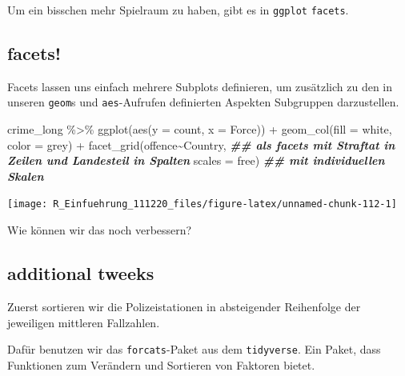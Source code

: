 \documentclass[
]{book}
\newenvironment{Shaded}{\begin{snugshade}}{\end{snugshade}}
\newcommand{\AttributeTok}[1]{\textcolor[rgb]{0.77,0.63,0.00}{#1}}
\newcommand{\DocumentationTok}[1]{\textcolor[rgb]{0.56,0.35,0.01}{\textbf{\textit{#1}}}}
\newcommand{\FunctionTok}[1]{\textcolor[rgb]{0.00,0.00,0.00}{#1}}
\newcommand{\NormalTok}[1]{#1}
\newcommand{\SpecialCharTok}[1]{\textcolor[rgb]{0.00,0.00,0.00}{#1}}
\newcommand{\StringTok}[1]{\textcolor[rgb]{0.31,0.60,0.02}{#1}}
\begin{document}
Um ein bisschen mehr Spielraum zu haben, gibt es in \texttt{ggplot} \texttt{facets}.

\hypertarget{facets}{%
\subsection{facets!}\label{facets}}

Facets lassen uns einfach mehrere Subplots definieren, um zusätzlich zu den in unseren \texttt{geom}s und \texttt{aes}-Aufrufen definierten Aspekten Subgruppen darzustellen.

\begin{Shaded}
\begin{Highlighting}[]
\NormalTok{crime\_long }\SpecialCharTok{\%\textgreater{}\%}  
  \FunctionTok{ggplot}\NormalTok{(}\FunctionTok{aes}\NormalTok{(}\AttributeTok{y =}\NormalTok{ count,}
             \AttributeTok{x =}\NormalTok{ Force)) }\SpecialCharTok{+}
  \FunctionTok{geom\_col}\NormalTok{(}\AttributeTok{fill =} \StringTok{\textquotesingle{}white\textquotesingle{}}\NormalTok{,}
           \AttributeTok{color =} \StringTok{\textquotesingle{}grey\textquotesingle{}}\NormalTok{) }\SpecialCharTok{+}
  \FunctionTok{facet\_grid}\NormalTok{(offence}\SpecialCharTok{\textasciitilde{}}\NormalTok{Country, }\DocumentationTok{\#\# als facets mit Straftat in Zeilen und Landesteil in Spalten}
             \AttributeTok{scales =} \StringTok{\textquotesingle{}free\textquotesingle{}}\NormalTok{) }\DocumentationTok{\#\# mit individuellen Skalen}
\end{Highlighting}
\end{Shaded}

\begin{center}\texttt{[image: R\_Einfuehrung\_111220\_files/figure-latex/unnamed-chunk-112-1]} \end{center}

Wie können wir das noch verbessern?

\hypertarget{additional-tweeks}{%
\subsection{additional tweeks}\label{additional-tweeks}}

Zuerst sortieren wir die Polizeistationen in absteigender Reihenfolge der jeweiligen mittleren Fallzahlen.

Dafür benutzen wir das \texttt{forcats}-Paket aus dem \texttt{tidyverse}. Ein Paket, dass Funktionen zum Verändern und Sortieren von Faktoren bietet.
\end{document}
